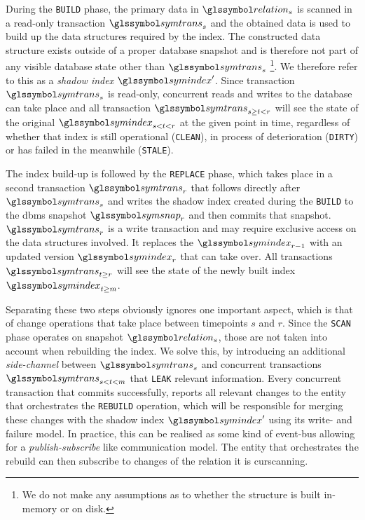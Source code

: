 During the \texttt{BUILD} phase, the primary data in $\relation_{s}$ is scanned in a read-only transaction $\symtrans_{s}$ and the obtained data is used to build up the data structures required by the index. The constructed data structure exists outside of a proper database snapshot and is therefore not part of any visible database state other than $\symtrans_{s}$ \footnote{We do not make any assumptions as to whether the structure is built in-memory or on disk.}. We therefore refer to this as a \emph{shadow index} $\symindex^{\prime}$. Since transaction $\symtrans_{s}$ is read-only, concurrent reads and writes to the database can take place and all transaction $\symtrans_{s \geq t < r}$ will see the state of the original $\symindex_{s < t < r}$ at the given point in time, regardless of whether that index is still operational (\texttt{CLEAN}), in process of deterioration (\texttt{DIRTY}) or has failed in the meanwhile (\texttt{STALE}). 

The index build-up is followed by the \texttt{REPLACE} phase, which takes place in a second transaction $\symtrans_{r}$ that follows directly after $\symtrans_{s}$ and writes the shadow index created during the \texttt{BUILD} to the \acrshort{dbms} snapshot $\symsnap_r$ and then commits that snapshot. $\symtrans_{r}$ is a write transaction and may require exclusive access on the data structures involved. It replaces the $\symindex_{r-1}$ with an updated version $\symindex_{r}$ that can take over. All transactions $\symtrans_{t \geq r}$ will see the state of the newly built index $\symindex_{t \geq m}$. 

Separating these two steps obviously ignores one important aspect, which is that of change operations that take place between timepoints $s$ and $r$. Since the \texttt{SCAN} phase operates on snapshot $\relation_{s}$, those are not taken into account when rebuilding the index. We solve this, by introducing an additional \emph{side-channel} between $\symtrans_{s}$ and concurrent transactions $\symtrans_{s < t < m}$ that \texttt{LEAK} relevant information. Every concurrent transaction that commits successfully, reports all relevant changes to the entity that orchestrates the \texttt{REBUILD} operation, which will be responsible for merging these changes with the shadow index $\symindex^{\prime}$ using its write- and failure model. In practice, this can be realised as some kind of event-bus allowing for a \emph{publish-subscribe} like communication model. The entity that orchestrates the rebuild can then subscribe to changes of the relation it is curscanning.

